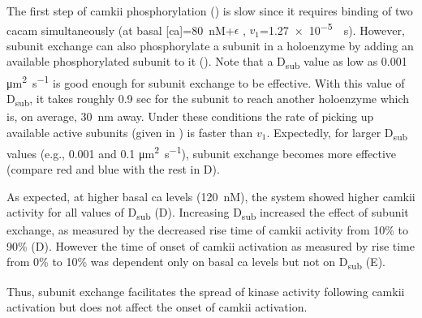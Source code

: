 \documentclass[9pt,lineno,doublespacing]{elife}
\newcommand\SUB[2]{#1\textsubscript{#2}}
\begin{document}
The first step of \gls{camkii} phosphorylation () is slow since it
requires binding of two \gls{cacam} simultaneously (at basal
[\gls{ca}]=\SI{80}{\nano M}+$\epsilon$ , $v_1$=\SI{1.27e-5}{\per\second}).
However, subunit exchange can also phosphorylate a subunit in a holoenzyme by
adding an available phosphorylated subunit to it (). Note that a
\SUB{D}{sub} value as low as 0.001 \si{\micro\meter\squared\per\second} is good
enough for subunit exchange to be effective. With this value of \SUB{D}{sub}, it
takes roughly 0.9 sec for the subunit to reach another holoenzyme which is, on
average, \SI{30}{\nano\meter} away. Under these conditions the rate of picking
up available active subunits (given in ) is faster than $v_1$.
Expectedly, for larger \SUB{D}{sub} values (e.g., 0.001 and 0.1
\si{\micro\meter\squared\per\second}), subunit exchange becomes more effective
(compare red and blue with the rest in D). 

As expected, at higher basal \gls{ca} levels (\SI{120}{\nano M}), the system
showed higher \gls{camkii} activity for all values of \SUB{D}{sub}
(D). Increasing \SUB{D}{sub} increased the
effect of subunit exchange, as measured by the decreased rise time of
\gls{camkii} activity from 10\% to 90\% (D).
However the time of onset of \gls{camkii} activation as measured by rise time
from 0\% to 10\% was dependent only on basal \gls{ca} levels but not on
\SUB{D}{sub} (E).

Thus, subunit exchange facilitates the spread of kinase activity following
\gls{camkii} activation but does not affect the onset of \gls{camkii}
activation.
\end{document}
